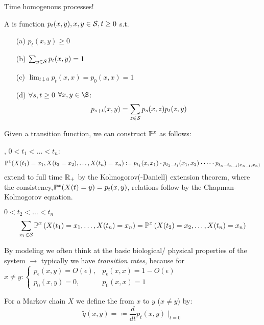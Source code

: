  Time homogenous processes! 

\begin{definition}\label{def:1.2}
    A  is function \(p_t(x,y),x,y\in\mathcal{S},t\geq 0\) s.t. 
    \begin{enumerate}
        \item[(a)]  \(p_t(x,y)\geq 0\)
        \item[(b)]  \(\sum_{y\in\mathcal{S}} p_t(x,y)=1\)
        \item[(c)]  \(\lim_{t\downarrow 0} p_t(x,x)=p_0(x,x)=1\)
        \item[(d)]  \(\forall s,t\geq 0\) \(\forall x,y\in \S\):\[p_{s+t}(x,y)=\sum_{z\in\mathcal{S}} p_s(x,z)p_t(z,y)\] 
    \end{enumerate}
\end{definition}

Given a transition function, we can construct \(\mathbb{P}^x\) as follows:

, \(0<t_1<\dots<t_n\): 
\begin{eqnarray*}
    \mathbb{P}^x(X(t_1)=x_1,X(t_2=x_2),\dots,X(t_n)=x_n)\coloneqq p_{t_1}(x,x_1)\cdot p_{t_2-t_1}(x_1,x_2)\cdot\dots\cdot p_{t_n-t_{n-1}(x_{n-1},x_n)}
\end{eqnarray*}
extend to full time \(\mathbb{R}_+\) by the Kolmogorov(-Daniell) extension theorem, where the consistency,\(\mathbb{P}^x(X(t)=y)=p_t(x,y)\), 
relations follow by the Chapman-Kolmogorov equation.

\begin{example*}
    \(0<t_2<\dots<t_n\)
    \begin{equation*}
       \sum_{x_1\in\mathcal{S}}\mathbb{P}^x\left(X(t_1)=x_1,\dots,X(t_n)=x_n\right)=\mathbb{P}^x\left(X(t_2)=x_2,\dots,X(t_n)=x_n\right)
    \end{equation*}
\end{example*}

By modeling we often think at the basic biological/ physical properties of the system \(\to\)
typically we have \textit{transition rates}, because for \( x\neq y: 
\begin{cases}
    p_\epsilon(x,y)=O(\epsilon),& p_\epsilon(x,x)=1-O(\epsilon)\\
      p_0(x,y)=0,&p_0(x,x)=1
\end{cases}
\)
\begin{definition}\label{def:1.3}
    For a Markov chain \(X\) we define the  from \(x\) to \(y\) (\(x\neq y\)) by:
    \[\tilde{q}(x,y)=\coloneqq \frac{d}{dt}p_t(x,y)\mid_{t=0}\]
\end{definition}


